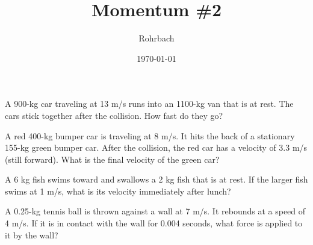 \documentclass[10pt]{exam}
\title{Momentum \#2}
\author{Rohrbach}
\date{\today}
\begin{document}
\maketitle

\begin{questions}
  
  \question
    A 900-kg car traveling at 13 m/s runs into an 1100-kg van that is at rest. The cars stick together after the collision. How fast do they go?
    \vs

  \question 
    A red 400-kg bumper car is traveling at 8 m/s.  It hits the back of a stationary 155-kg green bumper car.  After the collision, the red car has a velocity of 3.3 m/s (still forward).  What is the final velocity of the green car?
    \vs
  
  \pagebreak

  \question
    A 6 kg fish swims toward and swallows a 2 kg fish that is at rest. If the larger fish swims at 1 m/s, what is its velocity immediately after lunch?
    \vs
    
  \question
    A 0.25-kg tennis ball is thrown against a wall at 7 m/s.  It rebounds at a speed of 4 m/s.  If it is in contact with the wall for 0.004 seconds, what force is applied to it by the wall?
    \vs

\end{questions}
\end{document}
